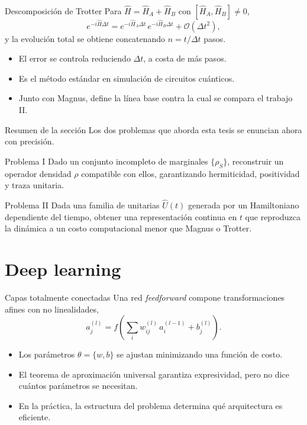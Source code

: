 \documentclass[10pt,aspectratio=169]{beamer}
\newcommand{\Uop}{\hat{U}}
\newcommand{\Hop}{\hat{H}}
\newcommand{\dens}{\rho}
\begin{document}
\begin{frame}{Descomposición de Trotter}
  Para $\Hop = \Hop_A + \Hop_B$ con $[\Hop_A,\Hop_B]\neq 0$,
  \[
    e^{-i\Hop \Delta t} = e^{-i\Hop_A \Delta t}\, e^{-i\Hop_B \Delta t} + \mathcal{O}(\Delta t^2),
  \]
  y la evolución total se obtiene concatenando $n = t/\Delta t$ pasos.
  \pause
  \vfill
  \begin{itemize}
    \item El error se controla reduciendo $\Delta t$, a costa de más pasos.
    \item Es el método estándar en simulación de circuitos cuánticos.
    \item Junto con Magnus, define la línea base contra la cual se compara el trabajo II.
  \end{itemize}
\end{frame}

\begin{frame}{Resumen de la sección}
  Los dos problemas que aborda esta tesis se enuncian ahora con precisión.
  \vfill
  \begin{block}{Problema I}
    Dado un conjunto incompleto de marginales $\{\dens_S\}$, reconstruir un operador densidad $\dens$ compatible con ellos, garantizando hermiticidad, positividad y traza unitaria.
  \end{block}
  \pause
  \begin{block}{Problema II}
    Dada una familia de unitarias $\Uop(t)$ generada por un Hamiltoniano dependiente del tiempo, obtener una representación continua en $t$ que reproduzca la dinámica a un costo computacional menor que Magnus o Trotter.
  \end{block}
\end{frame}

\section{Deep learning}

\begin{frame}{Capas totalmente conectadas}
  Una red \emph{feedforward} compone transformaciones afines con no linealidades,
  \[
    a^{(l)}_j = f\left(\sum_i w^{(l)}_{ij}\, a^{(l-1)}_i + b^{(l)}_j\right).
  \]
  \pause
  \vfill
  \begin{itemize}
    \item Los parámetros $\theta = \{w, b\}$ se ajustan minimizando una función de costo.
    \item El teorema de aproximación universal garantiza expresividad, pero no dice cuántos parámetros se necesitan.
    \item En la práctica, la estructura del problema determina qué arquitectura es eficiente.
  \end{itemize}
\end{frame}
\end{document}
